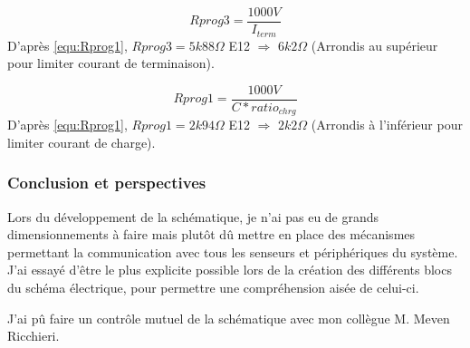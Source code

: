 {{	 	\begin{equation} \label{equ:Rprog3}
		 	Rprog3 = \frac{1000V}{I_{term}}
		\end{equation}
		D'après \ref{equ:Rprog1}, $Rprog3 = 5k88 \Omega$ E12 $\Longrightarrow$ $6k2\Omega$ (Arrondis au supérieur pour limiter courant de terminaison).
		
		\begin{equation} \label{equ:Rprog1}
			Rprog1 = \frac{1000V}{C * ratio_{chrg}} 
		\end{equation}
		D'après \ref{equ:Rprog1}, $Rprog1 = 2k94 \Omega$ E12 $\Longrightarrow$ $2k2\Omega$ (Arrondis à l'inférieur pour limiter courant de charge).
		 
	}
	
	\clearpage
	\subsubsection{Conclusion et perspectives} \label{sssec:MethSchematic}
	{
		Lors du développement de la schématique, je n'ai pas eu de grands dimensionnements à faire mais plutôt dû mettre en place des mécanismes permettant la communication avec tous les senseurs et périphériques du système. J'ai essayé d'être le plus explicite possible lors de la création des différents blocs du schéma électrique, pour permettre une compréhension aisée de celui-ci. 
		
		J'ai pû faire un contrôle mutuel de la schématique avec mon collègue M. Meven Ricchieri.
		
		
		
		
	}
	

}


\clearpage